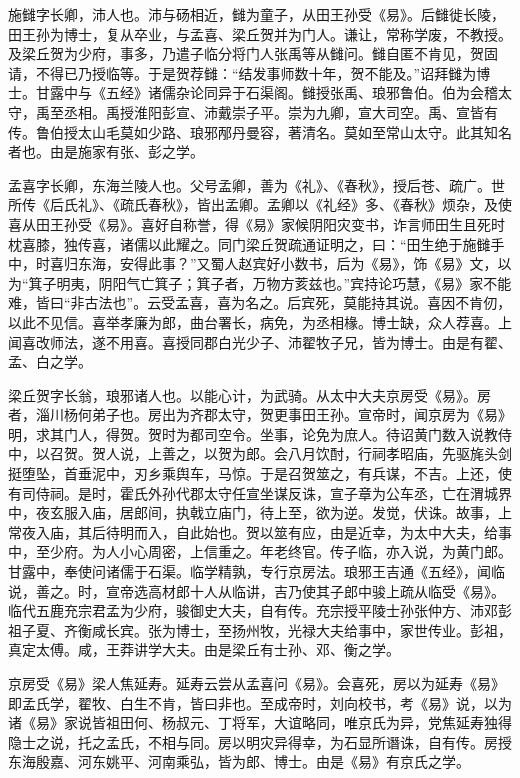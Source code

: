 \documentclass[]{article}
\begin{document}
施雠字长卿，沛人也。沛与砀相近，雠为童子，从田王孙受《易》。后雠徙长陵，田王孙为博士，复从卒业，与孟喜、梁丘贺并为门人。谦让，常称学废，不教授。及梁丘贺为少府，事多，乃遣子临分将门人张禹等从雠问。雠自匿不肯见，贺固请，不得已乃授临等。于是贺荐雠：``结发事师数十年，贺不能及。''诏拜雠为博士。甘露中与《五经》诸儒杂论同异于石渠阁。雠授张禹、琅邪鲁伯。伯为会稽太守，禹至丞相。禹授淮阳彭宣、沛戴崇子平。崇为九卿，宣大司空。禹、宣皆有传。鲁伯授太山毛莫如少路、琅邪邴丹曼容，著清名。莫如至常山太守。此其知名者也。由是施家有张、彭之学。

孟喜字长卿，东海兰陵人也。父号孟卿，善为《礼》、《春秋》，授后苍、疏广。世所传《后氏礼》、《疏氏春秋》，皆出孟卿。孟卿以《礼经》多、《春秋》烦杂，及使喜从田王孙受《易》。喜好自称誉，得《易》家候阴阳灾变书，诈言师田生且死时枕喜膝，独传喜，诸儒以此耀之。同门梁丘贺疏通证明之，曰：``田生绝于施雠手中，时喜归东海，安得此事？''又蜀人赵宾好小数书，后为《易》，饰《易》文，以为``箕子明夷，阴阳气亡箕子；箕子者，万物方荄兹也。''宾持论巧慧，《易》家不能难，皆曰``非古法也''。云受孟喜，喜为名之。后宾死，莫能持其说。喜因不肯仞，以此不见信。喜举孝廉为郎，曲台署长，病免，为丞相椽。博士缺，众人荐喜。上闻喜改师法，遂不用喜。喜授同郡白光少子、沛翟牧子兄，皆为博士。由是有翟、孟、白之学。

梁丘贺字长翁，琅邪诸人也。以能心计，为武骑。从太中大夫京房受《易》。房者，淄川杨何弟子也。房出为齐郡太守，贺更事田王孙。宣帝时，闻京房为《易》明，求其门人，得贺。贺时为都司空令。坐事，论免为庶人。待诏黄门数入说教侍中，以召贺。贺人说，上善之，以贺为郎。会八月饮酎，行祠孝昭庙，先驱旄头剑挺堕坠，首垂泥中，刃乡乘舆车，马惊。于是召贺筮之，有兵谋，不吉。上还，使有司侍祠。是时，霍氏外孙代郡太守任宣坐谋反诛，宣子章为公车丞，亡在渭城界中，夜玄服入庙，居郎间，执戟立庙门，待上至，欲为逆。发觉，伏诛。故事，上常夜入庙，其后待明而入，自此始也。贺以筮有应，由是近幸，为太中大夫，给事中，至少府。为人小心周密，上信重之。年老终官。传子临，亦入说，为黄门郎。甘露中，奉使问诸儒于石渠。临学精孰，专行京房法。琅邪王吉通《五经》，闻临说，善之。时，宣帝选高材郎十人从临讲，吉乃使其子郎中骏上疏从临受《易》。临代五鹿充宗君孟为少府，骏御史大夫，自有传。充宗授平陵士孙张仲方、沛邓彭祖子夏、齐衡咸长宾。张为博士，至扬州牧，光禄大夫给事中，家世传业。彭祖，真定太傅。咸，王莽讲学大夫。由是梁丘有士孙、邓、衡之学。

京房受《易》梁人焦延寿。延寿云尝从孟喜问《易》。会喜死，房以为延寿《易》即孟氏学，翟牧、白生不肯，皆曰非也。至成帝时，刘向校书，考《易》说，以为诸《易》家说皆祖田何、杨叔元、丁将军，大谊略同，唯京氏为异，党焦延寿独得隐士之说，托之孟氏，不相与同。房以明灾异得幸，为石显所谮诛，自有传。房授东海殷嘉、河东姚平、河南乘弘，皆为郎、博士。由是《易》有京氏之学。
\end{document}
